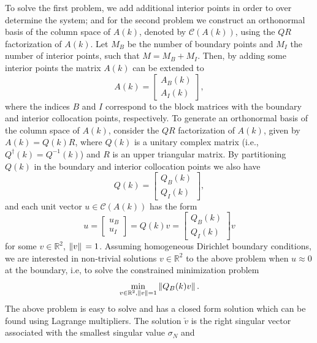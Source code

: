 To solve the first problem, we add additional interior points in order to over determine the system; and for the second problem we construct an orthonormal basis of the column space of \(A(k)\), denoted by \(\mathcal{C}(A(k))\), using the \(QR\) factorization of \(A(k)\). Let \(M_B\) be the number of boundary points and \(M_I\) the number of interior points, such that \(M=M_B+M_I\). Then, by adding some interior points the matrix \(A(k)\) can be extended to
\[
    A(k) = \begin{bmatrix}
        A_B(k)\\
        A_I(k)
    \end{bmatrix},
\]
where the indices \(B\) and \(I\) correspond to the block matrices with the boundary and interior collocation points, respectively. To generate an orthonormal basis of the column space of \(A(k)\), consider the \(QR\) factorization of \(A(k)\), given by \(A(k)=Q(k)R\), where \(Q(k)\) is a unitary complex matrix (i.e., \(Q^\dagger(k) = Q^{-1}(k)\)) and \(R\) is an upper triangular matrix. By partitioning \(Q(k)\) in the boundary and interior collocation points we also have
\begin{equation*}
    Q(k) = \begin{bmatrix}
        Q_B(k)\\
        Q_I(k)
    \end{bmatrix},
\end{equation*}
and each unit vector \(u \in \mathcal{C}(A(k))\) has the form
\begin{equation}\label{sat_qr}
    u = \begin{bmatrix}
        u_B\\
        u_I
    \end{bmatrix} = Q(k)v = \begin{bmatrix}
        Q_B(k)\\
        Q_I(k)
    \end{bmatrix}v
\end{equation}
for some \(v \in \mathbb{R}^2\), \(\norm*{v} = 1\). Assuming homogeneous Dirichlet boundary conditions, we are interested in non-trivial solutions \(v \in \mathbb{R}^2\) to the above problem when \(u \approx 0\) at the boundary, i.e, to solve the constrained minimization problem
\[
    \min_{v \in \mathbb{R}^2, \norm*{v}=1} \norm*{Q_B(k) v}. 
\]
The above problem is easy to solve and has a closed form solution which can be found using Lagrange multipliers. The solution \(\check{v}\) is the right singular vector associated with the smallest singular value \(\sigma_N\) and
